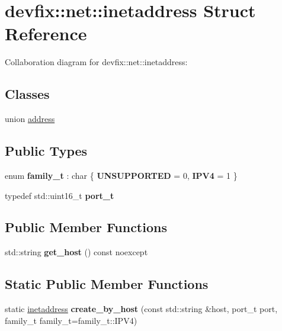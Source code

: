 \hypertarget{structdevfix_1_1net_1_1inetaddress}{}\section{devfix\+:\+:net\+:\+:inetaddress Struct Reference}
\label{structdevfix_1_1net_1_1inetaddress}


Collaboration diagram for devfix\+:\+:net\+:\+:inetaddress\+:
\subsection*{Classes}
\begin{DoxyCompactItemize}
\item 
union \hyperlink{uniondevfix_1_1net_1_1inetaddress_1_1address}{address}
\end{DoxyCompactItemize}
\subsection*{Public Types}
\begin{DoxyCompactItemize}
\item 
\mbox{\label{structdevfix_1_1net_1_1inetaddress_a31ec66f69260c75bfa5105d8e042ff06}} 
enum {\bfseries family_t} \+: char \{ {\bfseries U\+N\+S\+U\+P\+P\+O\+R\+T\+ED} = 0,
{\bfseries I\+P\+V4} = 1
 \}
\item 
\mbox{\label{structdevfix_1_1net_1_1inetaddress_a3eaadc730f2b4625987cf948ea485410}} 
typedef std\+::uint16\+\_\+t {\bfseries port\+\_\+t}
\end{DoxyCompactItemize}
\subsection*{Public Member Functions}
\begin{DoxyCompactItemize}
\item 
\mbox{\label{structdevfix_1_1net_1_1inetaddress_a4524692fae7a767e38600012c6f8f3cf}} 
std\+::string {\bfseries get\+\_\+host} () const noexcept
\end{DoxyCompactItemize}
\subsection*{Static Public Member Functions}
\begin{DoxyCompactItemize}
\item 
\mbox{\label{structdevfix_1_1net_1_1inetaddress_a1805a7f56b3c4313232293580b052c7c}} 
static \hyperlink{structdevfix_1_1net_1_1inetaddress}{inetaddress} {\bfseries create\+\_\+by\+\_\+host} (const std\+::string \&host, port\+\_\+t port, family_t family_t=family_t\+::\+I\+P\+V4)
\end{DoxyCompactItemize}
